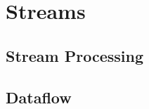 \chapter{Streams}
\label{chapter:streams}


\section{Stream Processing}
\label{sec:stream-processing}


\section{Dataflow}
\label{sec:dataflow-models}


